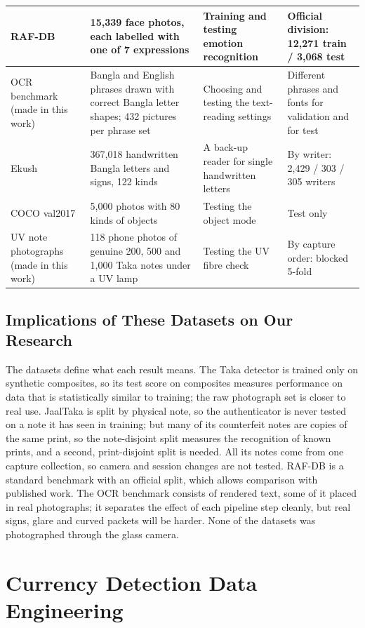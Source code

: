 \begin{table}[!htbp]
\begin{tabular}{|L{3.0cm}|L{3.9cm}|L{3.1cm}|L{3.9cm}|}
RAF-DB \cite{rafdb} & 15,339 face photos, each labelled with one of 7 expressions & Training and testing emotion recognition & Official division: 12,271 train / 3,068 test \\ \hline
OCR benchmark (made in this work) & Bangla and English phrases drawn with correct Bangla letter shapes; 432 pictures per phrase set & Choosing and testing the text-reading settings & Different phrases and fonts for validation and for test \\ \hline
Ekush \cite{ekush} & 367,018 handwritten Bangla letters and signs, 122 kinds & A back-up reader for single handwritten letters & By writer: 2,429 / 303 / 305 writers \\ \hline
COCO val2017 & 5,000 photos with 80 kinds of objects & Testing the object mode & Test only \\ \hline
UV note photographs (made in this work) & 118 phone photos of genuine 200, 500 and 1,000 Taka notes under a UV lamp & Testing the UV fibre check & By capture order: blocked 5-fold \\ \hline
\end{tabular}
\end{table}
\FloatBarrier

\subsection{Implications of These Datasets on Our Research}
The datasets define what each result means. The Taka detector is trained only on synthetic composites, so its test score on composites measures performance on data that is statistically similar to training; the raw photograph set is closer to real use. JaalTaka is split by physical note, so the authenticator is never tested on a note it has seen in training; but many of its counterfeit notes are copies of the same print, so the note-disjoint split measures the recognition of known prints, and a second, print-disjoint split is needed. All its notes come from one capture collection, so camera and session changes are not tested. RAF-DB is a standard benchmark with an official split, which allows comparison with published work. The OCR benchmark consists of rendered text, some of it placed in real photographs; it separates the effect of each pipeline step cleanly, but real signs, glare and curved packets will be harder. None of the datasets was photographed through the glass camera.

\section{Currency Detection Data Engineering}

